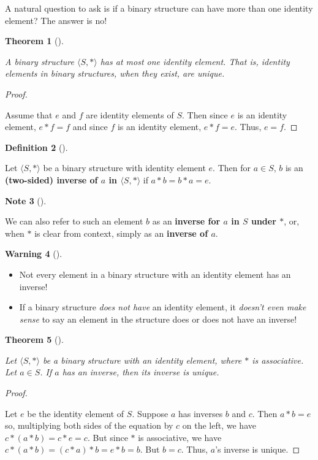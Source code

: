 \documentclass[10pt,]{book}
\newcommand{\terminology}[1]{\textbf{#1}}
\theoremstyle{plain}
\newtheorem{theorem}{Theorem}[section]
\theoremstyle{definition}
\newtheorem{definition}[theorem]{Definition}
\theoremstyle{definition}
\newtheorem{note}[theorem]{Note}
\newtheorem{warning}[theorem]{Warning}
\theoremstyle{definition}
\theoremstyle{definition}
\numberwithin{equation}{section}
\begin{document}
    A natural question to ask is if a binary structure can have
    more than one identity element? The answer is no!
\begin{theorem}[{}]\label{uniqueid}

        A binary structure \(\langle S, *\rangle\) has \emph{at most one} identity element. That is, identity elements in binary structures, when they exist, are unique.
\end{theorem}
\begin{proof}\hypertarget{proof-5}{}

      Assume that \(e\) and \(f\) are identity elements of \(S\). Then since \(e\) is an identity element, \(e*f=f\) and since \(f\) is an identity element, \(e*f=e\). Thus, \(e=f\).
\end{proof}
\begin{definition}[{}]\label{definition-18}

        Let \(\langle S, *\rangle\) be a binary structure with identity
        element \(e\). Then for \(a\in S\), \(b\) is an \terminology{(two-sided)
        inverse of \(a\) in \(\langle S,*\rangle\)} if \(a*b=b*a=e\).
\end{definition}
\begin{note}[]\label{note-5}

    We can also refer to such an element \(b\) as an \terminology{inverse for \(a\) in \(S\) under \(*\)}, or, when \(*\) is clear from context, simply as an \terminology{inverse of \(a\)}.
\end{note}
\begin{warning}[]\label{warning-5}
\leavevmode%
\begin{itemize}[label=\textbullet]
\item{}
          Not every element in a binary structure with an identity element has an inverse!
\item{}
          If a binary structure \emph{does not have} an identity element, it \emph{doesn't even make sense} to say an element in the
          structure does or does not have an inverse!
\end{itemize}
\end{warning}
\begin{theorem}[{}]\label{uniqueinverse}

        Let \(\langle S, *\rangle\) be a binary structure with an identity element, where \(*\) is associative. Let \(a\in S\). If \(a\) has an inverse, then its inverse is unique.
\end{theorem}
\begin{proof}\hypertarget{proof-6}{}

      Let \(e\) be the identity element of \(S\). Suppose \(a\) has inverses \(b\) and \(c\). Then \(a*b=e\) so, multiplying both sides of the equation by \(c\) on the left, we have \(c*(a*b)=c*e=c\). But since \(*\) is associative, we have \(c*(a*b)=(c*a)*b=e*b=b\). But \(b=c\). Thus, \(a\)'s inverse is unique.
\end{proof}
\typeout{************************************************}
\typeout{************************************************}
\end{document}
